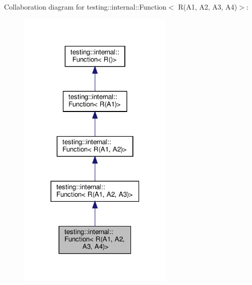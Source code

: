 Collaboration diagram for testing\+:\+:internal\+:\+:Function$<$ R(A1, A2, A3, A4)$>$\+:
\nopagebreak
\begin{figure}[H]
\begin{center}
\leavevmode
\includegraphics[width=211pt]{structtesting_1_1internal_1_1_function_3_01_r_07_a1_00_01_a2_00_01_a3_00_01_a4_08_4__coll__graph}
\end{center}
\end{figure}
